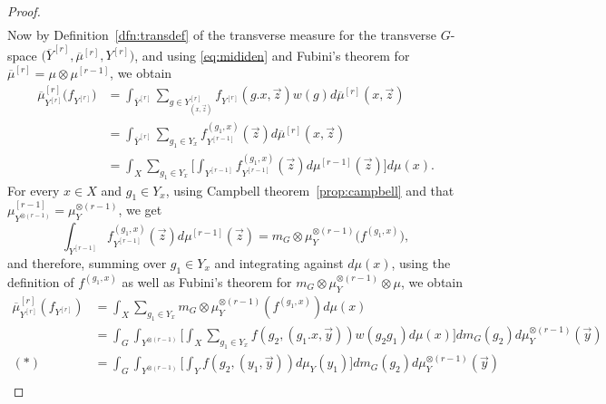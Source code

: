 \documentclass{amsart}
\numberwithin{equation}{subsection}
\theoremstyle{remark}
\begin{document}
\begin{proof}
\begin{align*}
\end{align*}
Now by Definition~\ref{dfn:transdef} of the transverse measure for the transverse \(G\)-space \(\big(\overline{Y}^{\left[r\right]},\overline{\mu}^{\left[r\right]},Y^{\left[r\right]}\big)\), and using \eqref{eq:mididen} and Fubini's theorem for \(\overline{\mu}^{\left[r\right]}=\mu\otimes\mu^{\left[r-1\right]}\), we obtain
\begin{align*}
\overline{\mu}_{Y^{\left[r\right]}}^{\left[r\right]}\big(f_{Y^{\left[r\right]}}\big)
&=\int_{\overline{Y}^{\left[r\right]}}\sum\nolimits_{g\in Y_{\left(x,\vec{z}\right)}^{\left[r\right]}}f_{Y^{\left[r\right]}}\left(g.x,\vec{z}\right)w\left(g\right)d\overline{\mu}^{\left[r\right]}\left(x,\vec{z}\right)\\
&=\int_{\overline{Y}^{\left[r\right]}}\sum\nolimits_{g_{1}\in Y_{x}}f_{Y^{\left[r-1\right]}}^{\left(g_{1},x\right)}\left(\vec{z}\right)d\overline{\mu}^{\left[r\right]}\left(x,\vec{z}\right)\\
&=\int_{X}\sum\nolimits_{g_{1}\in Y_{x}}\Big[\int_{Y^{\left[r-1\right]}}f_{Y^{\left[r-1\right]}}^{\left(g_{1},x\right)}\left(\vec{z}\right)d\mu^{\left[r-1\right]}\left(\vec{z}\right)\Big]d\mu\left(x\right).
\end{align*}
For every \(x\in X\) and \(g_{1}\in Y_{x}\), using Campbell theorem~\ref{prop:campbell} and that \(\mu_{Y^{\otimes\left(r-1\right)}}^{\left[r-1\right]}=\mu_{Y}^{\otimes\left(r-1\right)}\), we get
\[\int_{Y^{\left[r-1\right]}}f_{Y^{\left[r-1\right]}}^{\left(g_{1},x\right)}\left(\vec{z}\right)d\mu^{\left[r-1\right]}\left(\vec{z}\right)=m_{G}\otimes\mu_{Y}^{\otimes\left(r-1\right)}\big(f^{\left(g_{1},x\right)}\big),\]
and therefore, summing over \(g_{1}\in Y_{x}\) and integrating against \(d\mu\left(x\right)\), using the definition of \(f^{\left(g_{1},x\right)}\) as well as Fubini's theorem for \(m_{G}\otimes\mu_{Y}^{\otimes\left(r-1\right)}\otimes\mu\), we obtain
\begin{align*}
\overline{\mu}_{Y^{\left[r\right]}}^{\left[r\right]}\left(f_{Y^{\left[r\right]}}\right)
&=\int_{X}\sum\nolimits_{g_{1}\in Y_{x}}m_{G}\otimes\mu_{Y}^{\otimes\left(r-1\right)}\left(f^{\left(g_{1},x\right)}\right)d\mu\left(x\right)\\
&=\int_{G}\int_{Y^{\otimes\left(r-1\right)}}\Big[\int_{X}\sum\nolimits_{g_{1}\in Y_{x}}f\left(g_{2},\left(g_{1}.x,\vec{y}\right)\right)w\left(g_{2}g_{1}\right)d\mu\left(x\right)\Big]dm_{G}\left(g_{2}\right)d\mu_{Y}^{\otimes\left(r-1\right)}\left(\vec{y}\right)\\
\left(\ast\right)&=\int_{G}\int_{Y^{\otimes\left(r-1\right)}}\Big[\int_{Y}f\left(g_{2},\left(y_{1},\vec{y}\right)\right)d\mu_{Y}\left(y_{1}\right)\Big]dm_{G}\left(g_{2}\right)d\mu_{Y}^{\otimes\left(r-1\right)}\left(\vec{y}\right)\\

\end{align*}
\end{proof}
\end{document}
